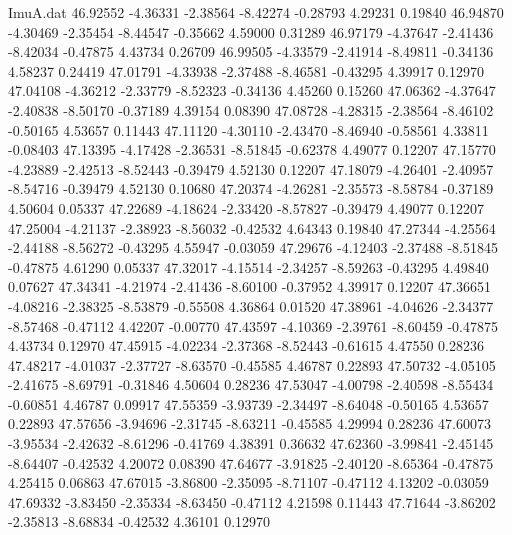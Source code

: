 \begin{filecontents}{ImuA.dat}
  46.92552   -4.36331   -2.38564   -8.42274   -0.28793    4.29231    0.19840
  46.94870   -4.30469   -2.35454   -8.44547   -0.35662    4.59000    0.31289
  46.97179   -4.37647   -2.41436   -8.42034   -0.47875    4.43734    0.26709
  46.99505   -4.33579   -2.41914   -8.49811   -0.34136    4.58237    0.24419
  47.01791   -4.33938   -2.37488   -8.46581   -0.43295    4.39917    0.12970
  47.04108   -4.36212   -2.33779   -8.52323   -0.34136    4.45260    0.15260
  47.06362   -4.37647   -2.40838   -8.50170   -0.37189    4.39154    0.08390
  47.08728   -4.28315   -2.38564   -8.46102   -0.50165    4.53657    0.11443
  47.11120   -4.30110   -2.43470   -8.46940   -0.58561    4.33811   -0.08403
  47.13395   -4.17428   -2.36531   -8.51845   -0.62378    4.49077    0.12207
  47.15770   -4.23889   -2.42513   -8.52443   -0.39479    4.52130    0.12207
  47.18079   -4.26401   -2.40957   -8.54716   -0.39479    4.52130    0.10680
  47.20374   -4.26281   -2.35573   -8.58784   -0.37189    4.50604    0.05337
  47.22689   -4.18624   -2.33420   -8.57827   -0.39479    4.49077    0.12207
  47.25004   -4.21137   -2.38923   -8.56032   -0.42532    4.64343    0.19840
  47.27344   -4.25564   -2.44188   -8.56272   -0.43295    4.55947   -0.03059
  47.29676   -4.12403   -2.37488   -8.51845   -0.47875    4.61290    0.05337
  47.32017   -4.15514   -2.34257   -8.59263   -0.43295    4.49840    0.07627
  47.34341   -4.21974   -2.41436   -8.60100   -0.37952    4.39917    0.12207
  47.36651   -4.08216   -2.38325   -8.53879   -0.55508    4.36864    0.01520
  47.38961   -4.04626   -2.34377   -8.57468   -0.47112    4.42207   -0.00770
  47.43597   -4.10369   -2.39761   -8.60459   -0.47875    4.43734    0.12970
  47.45915   -4.02234   -2.37368   -8.52443   -0.61615    4.47550    0.28236
  47.48217   -4.01037   -2.37727   -8.63570   -0.45585    4.46787    0.22893
  47.50732   -4.05105   -2.41675   -8.69791   -0.31846    4.50604    0.28236
  47.53047   -4.00798   -2.40598   -8.55434   -0.60851    4.46787    0.09917
  47.55359   -3.93739   -2.34497   -8.64048   -0.50165    4.53657    0.22893
  47.57656   -3.94696   -2.31745   -8.63211   -0.45585    4.29994    0.28236
  47.60073   -3.95534   -2.42632   -8.61296   -0.41769    4.38391    0.36632
  47.62360   -3.99841   -2.45145   -8.64407   -0.42532    4.20072    0.08390
  47.64677   -3.91825   -2.40120   -8.65364   -0.47875    4.25415    0.06863
  47.67015   -3.86800   -2.35095   -8.71107   -0.47112    4.13202   -0.03059
  47.69332   -3.83450   -2.35334   -8.63450   -0.47112    4.21598    0.11443
  47.71644   -3.86202   -2.35813   -8.68834   -0.42532    4.36101    0.12970

\end{filecontents}
